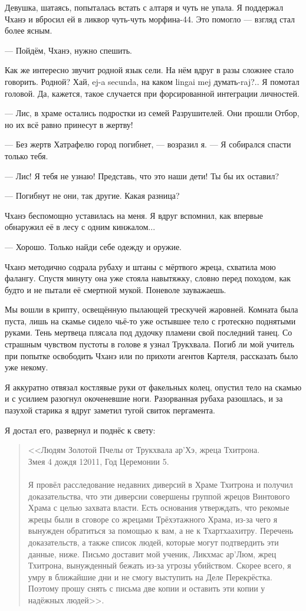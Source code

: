 Девушка, шатаясь, попыталась встать с алтаря и чуть не упала.
Я поддержал Чханэ и вбросил ей в ликвор чуть-чуть морфина-44.
Это помогло --- взгляд стал более ясным.

--- Пойдём, Чханэ, нужно спешить.

Как же интересно звучит родной язык сели.
На нём вдруг в разы сложнее стало говорить.
Родной?
Хай, ej-a secunda, на каком lingai mej думать-raj?..
Я помотал головой.
Да, кажется, такое случается при форсированной интеграции личностей.

--- Лис, в храме остались подростки из семей Разрушителей.
Они прошли Отбор, но их всё равно принесут в жертву!

--- Без жертв Хатрафелю город погибнет, --- возразил я.
--- Я собирался спасти только тебя.

--- Лис!
Я тебя не узнаю!
Представь, что это наши дети!
Ты бы их оставил?

--- Погибнут не они, так другие.
Какая разница?

Чханэ беспомощно уставилась на меня.
Я вдруг вспомнил, как впервые обнаружил её в лесу с одним кинжалом...

--- Хорошо.
Только найди себе одежду и оружие.

Чханэ методично содрала рубаху и штаны с мёртвого жреца, схватила мою фалангу.
Спустя минуту она уже стояла навытяжку, словно перед походом, как будто и не пытали её смертной мукой.
Поневоле зауважаешь.

Мы вошли в крипту, освещённую пылающей трескучей жаровней.
Комната была пуста, лишь на скамье сидело чьё-то уже остывшее тело с гротескно поднятыми руками.
Тень мертвеца плясала под дудочку пламени свой последний танец.
Со страшным чувством пустоты в голове я узнал Трукхвала.
Погиб ли мой учитель при попытке освободить Чханэ или по прихоти агентов Картеля, рассказать было уже некому.

Я аккуратно отвязал костлявые руки от факельных колец, опустил тело на скамью и с усилием разогнул окоченевшие ноги.
Разорванная рубаха разошлась, и за пазухой старика я вдруг заметил тугой свиток пергамента.

Я достал его, развернул и поднёс к свету:

\begin{quote}
<<Людям Золотой Пчелы от Трукхвала ар'Хэ, жреца Тхитрона.\\
Змея 4 дождя 12011, Год Церемонии 5.\\
~\\
Я провёл расследование недавних диверсий в Храме Тхитрона и получил доказательства, что эти диверсии совершены группой жрецов Винтового Храма с целью захвата власти.
Есть основания утверждать, что рекомые жрецы были в сговоре со жрецами Трёхэтажного Храма, из-за чего я вынужден обратиться за помощью к вам, а не к Тхартхаахитру.
Перечень доказательств, а также список людей, которые могут подтвердить эти данные, ниже.
Письмо доставит мой ученик, Ликхмас ар'Люм, жрец Тхитрона, вынужденный бежать из-за угрозы убийством.
Скорее всего, я умру в ближайшие дни и не смогу выступить на Деле Перекрёстка.
Поэтому прошу снять с письма две копии и оставить эти копии у надёжных людей>>.
\end{quote}

